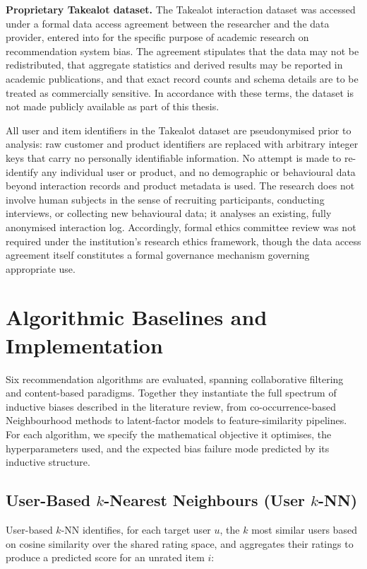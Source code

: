 \documentclass[11pt,a4paper]{report}
\begin{document}
\textbf{Proprietary Takealot dataset.} The Takealot interaction dataset was accessed under a formal data access agreement between the researcher and the data provider, entered into for the specific purpose of academic research on recommendation system bias. The agreement stipulates that the data may not be redistributed, that aggregate statistics and derived results may be reported in academic publications, and that exact record counts and schema details are to be treated as commercially sensitive. In accordance with these terms, the dataset is not made publicly available as part of this thesis.

All user and item identifiers in the Takealot dataset are pseudonymised prior to analysis: raw customer and product identifiers are replaced with arbitrary integer keys that carry no personally identifiable information. No attempt is made to re-identify any individual user or product, and no demographic or behavioural data beyond interaction records and product metadata is used. The research does not involve human subjects in the sense of recruiting participants, conducting interviews, or collecting new behavioural data; it analyses an existing, fully anonymised interaction log. Accordingly, formal ethics committee review was not required under the institution's research ethics framework, though the data access agreement itself constitutes a formal governance mechanism governing appropriate use.

\section{Algorithmic Baselines and Implementation}
\label{sec:method_algorithms}

Six recommendation algorithms are evaluated, spanning collaborative filtering and content-based paradigms. Together they instantiate the full spectrum of inductive biases described in the literature review, from co-occurrence-based Neighbourhood methods to latent-factor models to feature-similarity pipelines. For each algorithm, we specify the mathematical objective it optimises, the hyperparameters used, and the expected bias failure mode predicted by its inductive structure.

\subsection*{User-Based $k$-Nearest Neighbours (User $k$-NN)}

User-based $k$-NN identifies, for each target user $u$, the $k$ most similar users based on cosine similarity over the shared rating space, and aggregates their ratings to produce a predicted score for an unrated item $i$:
\end{document}

